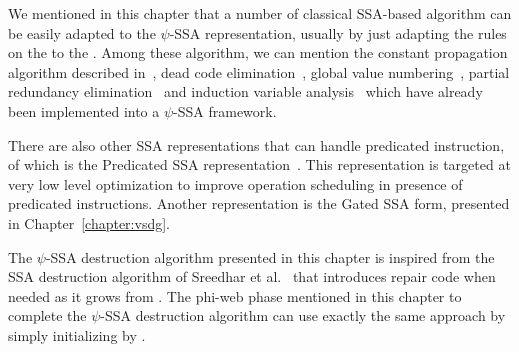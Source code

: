 We mentioned in this chapter that a number of classical SSA-based algorithm can be easily adapted to the $\psi$-SSA representation, usually by just adapting the rules on the \phifuns to the \psifuns. Among these algorithm, we can mention the constant propagation algorithm described in~\cite{WZ91}, dead code elimination~\cite{morgan98}, global value numbering~\cite{Cli95}, partial redundancy elimination~\cite{CCK+97} and induction variable analysis~\cite{Wolfe92} which have already been implemented into a $\psi$-SSA framework.

There are also other SSA representations that can handle predicated instruction, of which is the Predicated SSA representation~\cite{Carter:PACT99}. This representation is targeted at very low level optimization to improve operation scheduling in presence of predicated instructions. Another representation is the Gated SSA form, presented in Chapter~\ref{chapter:vsdg}.

The $\psi$-SSA destruction algorithm presented in this chapter is inspired from the SSA destruction algorithm of Sreedhar et al.~\cite{SreedharSep99} that introduces repair code when needed as it grows \phiwebs from \phifuns. The phi-web phase mentioned in this chapter to complete the $\psi$-SSA destruction algorithm can use exactly the same approach by simply initializing \phipsiwebs by \psiwebs.

